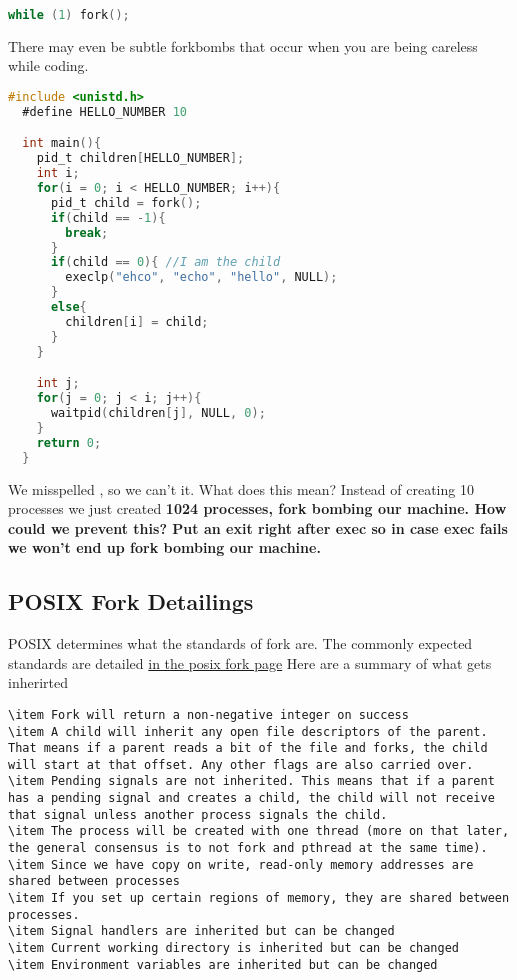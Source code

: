 \begin{lstlisting}[language=C]
  while (1) fork();
\end{lstlisting}

There may even be subtle forkbombs that occur when you are being careless while coding.

\begin{lstlisting}[language=C]
  #include <unistd.h>
  #define HELLO_NUMBER 10

  int main(){
    pid_t children[HELLO_NUMBER];
    int i;
    for(i = 0; i < HELLO_NUMBER; i++){
      pid_t child = fork();
      if(child == -1){
        break;
      }
      if(child == 0){ //I am the child
        execlp("ehco", "echo", "hello", NULL);
      }
      else{
        children[i] = child;
      }
    }

    int j;
    for(j = 0; j < i; j++){
      waitpid(children[j], NULL, 0);
    }
    return 0;
  }
\end{lstlisting}

We misspelled , so we can't  it. What does this mean? Instead of creating 10 processes we just created \textbf{1024 processes, fork bombing our machine. How could we prevent this? Put an exit right after exec so in case exec fails we won't end up fork bombing our machine.}

\subsection{POSIX Fork Detailings}

POSIX determines what the standards of fork are. The commonly expected standards are detailed \href{https://pubs.opengroup.org/onlinepubs/009695399/functions/fork.html}{in the posix fork page} Here are a summary of what gets inherirted

\begin{lstlisting}
\item Fork will return a non-negative integer on success
\item A child will inherit any open file descriptors of the parent. That means if a parent reads a bit of the file and forks, the child will start at that offset. Any other flags are also carried over.
\item Pending signals are not inherited. This means that if a parent has a pending signal and creates a child, the child will not receive that signal unless another process signals the child.
\item The process will be created with one thread (more on that later, the general consensus is to not fork and pthread at the same time).
\item Since we have copy on write, read-only memory addresses are shared between processes
\item If you set up certain regions of memory, they are shared between processes.
\item Signal handlers are inherited but can be changed
\item Current working directory is inherited but can be changed
\item Environment variables are inherited but can be changed
\end{lstlisting}

